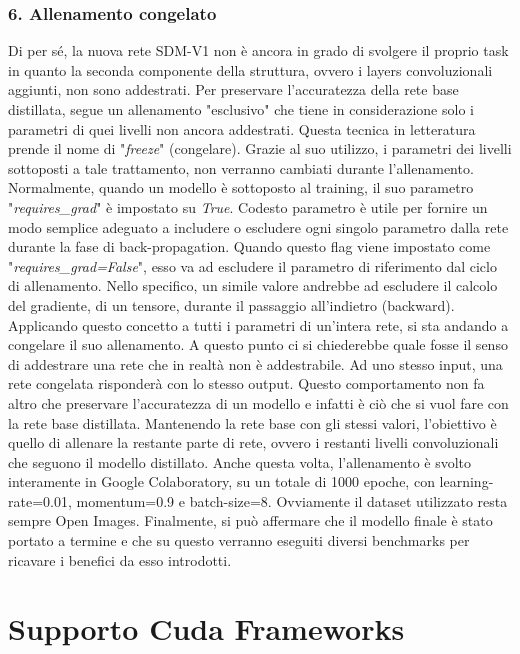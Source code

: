 \subsubsection{6. Allenamento congelato}
Di per sé, la nuova rete SDM-V1 non è ancora in grado di svolgere il proprio task in quanto la seconda componente della struttura, ovvero i layers convoluzionali aggiunti, non sono addestrati. Per preservare l'accuratezza della rete base distillata, segue un allenamento "esclusivo" che tiene in considerazione solo i parametri di quei livelli non ancora addestrati. Questa tecnica in letteratura prende il nome di "\emph{freeze}" (congelare). Grazie al suo utilizzo, i parametri dei livelli sottoposti a tale trattamento, non verranno cambiati durante l'allenamento. Normalmente, quando un modello è sottoposto al training, il suo parametro "\emph{requires\_grad}" è impostato su \emph{True}. Codesto parametro è utile per fornire un modo semplice adeguato a includere o escludere ogni singolo parametro dalla rete durante la fase di back-propagation. Quando questo flag viene impostato come "\emph{requires\_grad=False}", esso va ad escludere il parametro di riferimento dal ciclo di allenamento. Nello specifico, un simile valore andrebbe ad escludere il calcolo del gradiente, di un tensore, durante il passaggio all'indietro (backward). Applicando questo concetto a tutti i parametri di un'intera rete, si sta andando a congelare il suo allenamento. A questo punto ci si chiederebbe quale fosse il senso di addestrare una rete che in realtà non è addestrabile. Ad uno stesso input, una rete congelata risponderà con lo stesso output. Questo comportamento non fa altro che preservare l'accuratezza di un modello e infatti è ciò che si vuol fare con la rete base distillata. Mantenendo la rete base con gli stessi valori, l'obiettivo è quello di allenare la restante parte di rete, ovvero i restanti livelli convoluzionali che seguono il modello distillato. Anche questa volta, l'allenamento è svolto interamente in Google Colaboratory, su un totale di 1000 epoche, con learning-rate=0.01, momentum=0.9 e batch-size=8. Ovviamente il dataset utilizzato resta sempre Open Images. Finalmente, si può affermare che il modello finale è stato portato a termine e che su questo verranno eseguiti diversi benchmarks per ricavare i benefici da esso introdotti.  


\section{Supporto Cuda Frameworks}
